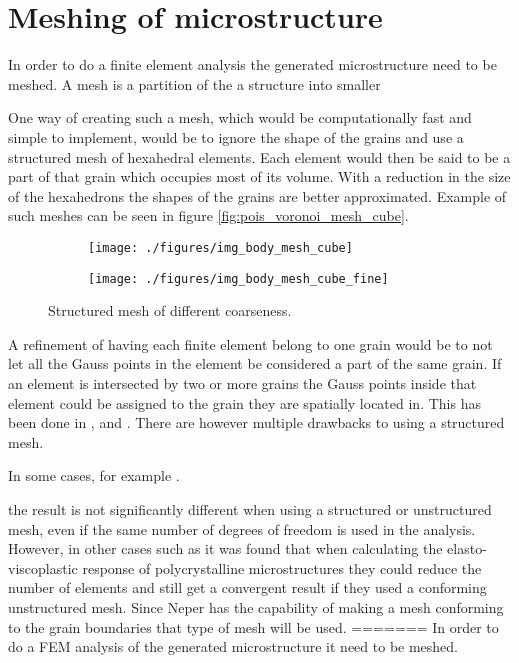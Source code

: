 \documentclass[meshing_micro.tex]{subfiles}
\begin{document}
\chapter{Meshing of microstructure}

In order to do a finite element analysis the generated microstructure need to be meshed. A mesh is a partition of the a structure into smaller 

One way of creating such a mesh, which would be computationally fast and simple to implement, would be to ignore the shape of the grains and use a structured mesh of hexahedral elements. Each element would then be said to be a part of that grain which occupies most of its volume. With a reduction in the size of the hexahedrons the shapes of the grains are better approximated. Example of such meshes can be seen in figure \ref{fig:pois_voronoi_mesh_cube}.

\begin{figure}
\centering
\begin{subfigure}[b]{.5\textwidth}
  \centering
  \texttt{[image: ./figures/img\_body\_mesh\_cube]}
  \caption{}
  \label{fig:mesh_a}
\end{subfigure}%
\begin{subfigure}[b]{.5\textwidth}
  \centering
  \texttt{[image: ./figures/img\_body\_mesh\_cube\_fine]}
  \caption{}
  \label{fig:mesh_b}
\end{subfigure}
\caption{Structured mesh of different coarseness.}
\label{fig:mesh}
\end{figure}

A refinement of having each finite element belong to one grain would be to not let all the Gauss points in the element be considered a part of the same grain. If an element is intersected by two or more grains the Gauss points inside that element could be assigned to the grain they are spatially located in. This has been done in \cite{Nygards20031049}, \cite{Cailletaud2003351} and \cite{Barbe2001513}. There are however multiple drawbacks to using a structured mesh. 



 In some cases, for example \cite{Bohlke201011}. 


 the result is not significantly different when using a structured or unstructured mesh, even if the same number of degrees of freedom is used in the analysis. However, in other cases such as \cite{Li20091163} it was found that when calculating the elasto-viscoplastic response of polycrystalline microstructures they could reduce the number of elements and still get a convergent result if they used a conforming unstructured mesh. Since Neper has the capability of making a mesh conforming to the grain boundaries that type of mesh will be used. 
=======
In order to do a FEM analysis of the generated microstructure it need to be meshed.
\end{document}
